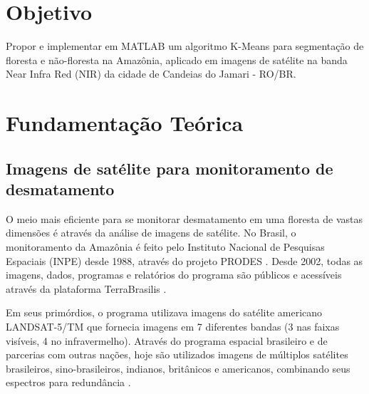 \documentclass[11pt]{article}
\date{Junho 2023} %
\begin{document}
\maketitle

\section{Objetivo}

Propor e implementar em MATLAB um algoritmo K-Means para segmentação de floresta e não-floresta na Amazônia, aplicado em imagens de satélite na banda Near Infra Red (NIR) da cidade de Candeias do Jamari - RO/BR.


\section{Fundamentação Teórica}

\subsection{Imagens de satélite para monitoramento de desmatamento}

O meio mais eficiente para se monitorar desmatamento em uma floresta de vastas dimensões é através da análise de imagens de satélite. No Brasil, o monitoramento da Amazônia é feito pelo Instituto Nacional de Pesquisas Espaciais (INPE) desde 1988, através do projeto PRODES \cite{inpe:prodes:2022}. Desde 2002, todas as imagens, dados, programas e relatórios do programa são públicos e acessíveis através da plataforma TerraBrasilis \cite{inpe:brasilis:2023}.

Em seus primórdios, o programa utilizava imagens do satélite americano LANDSAT-5/TM que fornecia imagens em 7 diferentes bandas (3 nas faixas visíveis, 4 no infravermelho). Através do programa espacial brasileiro e de parcerias com outras nações, hoje são utilizados imagens de múltiplos satélites brasileiros, sino-brasileiros, indianos, britânicos e americanos, combinando seus espectros para redundância \cite{inpe:prodes:2022}.


\end{document}
